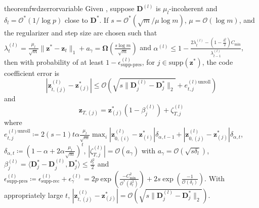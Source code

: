 \documentclass[10pt]{article} %
\newcommand{\D}{{\bm D}}
\newcommand{\z}{{\bm z}}
\begin{document}
%
%
\begin{restatable}{theorem}{fwdzerrorvariable}\label{thm:fwdzerrorvariable}
Given , suppose $\D^{(l)}$ is $\mu_l$-incoherent and $\delta_l = \mathcal{O}^{\ast}(1 / \log{p})$ close to $\D^{\ast}$. If $s = \mathcal{O}^{\ast}(\sqrt{m} / \mu \log{m})$, $\mu = \mathcal{O}(\log{m})$, and the regularizer and step size are chosen such that $\lambda_t^{(l)} = \frac{\mu_l}{\sqrt{m}} \| \z^{\ast} - \z_t \|_1 + a_{\gamma} = {\bm \Omega}(\frac{s \log{m}}{\sqrt{m}})$ and 
$\alpha^{(l)} \leq 1 - \frac{2\lambda_t^{(l)} - (1 - \frac{\delta_l^2}{2}) C_{\min}}{\lambda_{t-1}^{(l)}}$, then with probability of at least $1 - \epsilon^{(l)}_{\text{supp-pres}}$, for $j\in \text{supp}(\z^{\ast})$, the code coefficient error is
\begin{equation}
|\z_{t,(j)}^{(l)} - \z_{(j)}^{\ast} | \leq  \mathcal{O}(\sqrt{s \| \D_j^{(l)} - \D_j^{\ast} \|_2} + e_{t,j}^{(l)\text{unroll}})
\end{equation}
and
\begin{equation}
\z_{T, (j)} = \z^{\ast}_{(j)} (1 - \beta_j^{(l)}) + \zeta_{T,j}^{(l)}
\end{equation}
where $e_{t,j}^{(l)\text{unroll}} \coloneqq 2(s-1)t \alpha \frac{\mu_l}{\sqrt{m}} \max_i | \z_{0,(i)}^{(l)} - \z_{(i)}^{\ast} | \delta_{\alpha,t-1} + | \z_{0,(j)}^{(l)} - \z_{(j)}^{\ast} | \delta_{\alpha,t}$, $\delta_{\alpha, t} \coloneqq (1 - \alpha + 2 \alpha \frac{\mu_l}{\sqrt{m}})^t$, $| \zeta_{T,j}^{(l)} | = \mathcal{O}(a_{\gamma})$ with $a_{\gamma} = \mathcal{O}(\sqrt{s\delta_l})$, $\beta_j^{(l)} = \langle\D_j^{\ast} - \D_j^{(l)}, \D_j^{\ast}\rangle \leq \frac{\delta_l^2}{2}$ and  $\epsilon^{(l)}_{\text{supp-pres}} \coloneqq \epsilon^{(l)}_{\text{supp-rec}} + \epsilon^{(l)}_{\gamma} = 2 p \exp{(\frac{-C_{\min}^2}{\mathcal{O}^{\ast}(\delta_l^2)})}+ 2 s \exp{(\frac{-1}{\mathcal{O}(\delta_l)})}$. With appropriately large $t$, $|\z_{t,(j)}^{(l)} - \z_{(j)}^{\ast} | = \mathcal{O}(\sqrt{s \| \D_j^{(l)} - \D_j^{\ast} \|_2})$.
\end{restatable}
%
\end{document}
